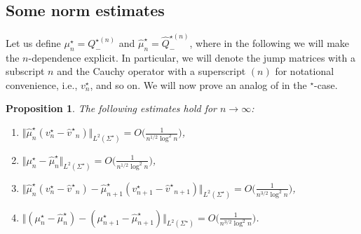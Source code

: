 \documentclass[11pt]{article}
\numberwithin{equation}{section}
\newcommand{\smu}{\mu^\star}
\newcommand{\shmu}{\widehat \mu^\star}
\newcommand{\sbv}{v^\star}
\newcommand{\shv}{{\widehat v^\star}}
\newcommand{\Cau}{\mathcal C_{\Sigma}}
\newtheorem{Proposition}[Theorem]{Proposition}
 { \theoremstyle{definition}
\newtheorem{Definition}[Theorem]{Definition}
\newtheorem{Note}[Theorem]{Note}
\newtheorem{Example}[Theorem]{Example}
\newtheorem{Remark}[Theorem]{Remark} }
\numberwithin{equation}{section}
\begin{document}
\subsection{Some norm estimates}
Let us define $\smu_{n} = Q_{-}^{\star (n)}$ and $\shmu_{n} = \widehat Q_{-}^{\star (n)}$, where in the following we will make the $n$-dependence explicit. In particular, we will denote the jump matrices with a subscript $n$ and the Cauchy operator with a superscript $(n)$ for notational convenience, i.e., $v^\star_n$, \smash{$\Cau^{(n)}$} and so on. We will now prove an analog of \cite[Proposition~5.1]{CD} in the ${}^\star$-case.
\begin{Proposition}\label{PropFourInt}
The following estimates hold for $n \to \infty$:
\begin{enumerate}[$(i)$]\itemsep=0pt
 \item $\Vert \shmu_n (\sbv_n - \shv_n) \Vert_{L^2(\Sigma^\star)} = O\big(\frac{1}{n^{1/2}\log^2 n}\big)$,
 \item $\Vert \smu_n - \shmu_n \Vert_{L^2(\Sigma^\star)} = O\big(\frac{1}{n^{1/2}\log^2 n}\big)$,
 \item $\Vert \shmu_n (\sbv_n - \shv_n) - \shmu_{n+1} (\sbv_{n+1} - \shv_{n+1}) \Vert_{L^2(\Sigma^\star)} = O\big(\frac{1}{n^{3/2}\log^2 n}\big)$,
 \item $\Vert (\smu_n - \shmu_n) - (\smu_{n+1} - \shmu_{n+1}) \Vert_{L^2(\Sigma^\star)} = O\big(\frac{1}{n^{3/2}\log^2 n}\big)$.
\end{enumerate}
\end{Proposition}
\end{document}
